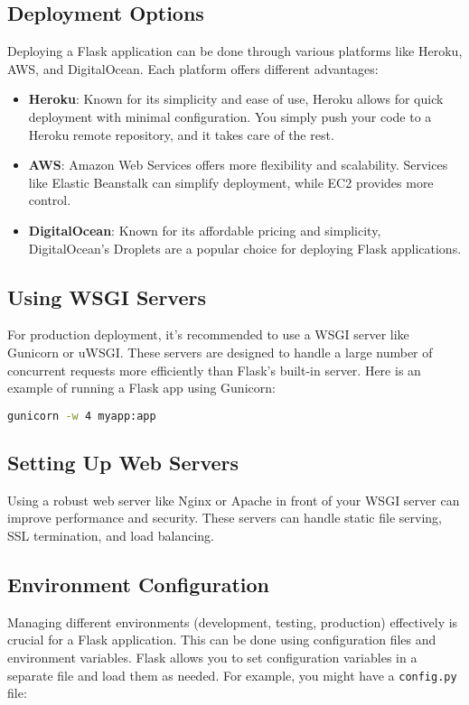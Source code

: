 \subsection{Deployment Options}
Deploying a Flask application can be done through various platforms like Heroku, AWS, and DigitalOcean. Each platform offers different advantages:
\begin{itemize}
	\item \textbf{Heroku}: Known for its simplicity and ease of use, Heroku allows for quick deployment with minimal configuration. You simply push your code to a Heroku remote repository, and it takes care of the rest.
	\item \textbf{AWS}: Amazon Web Services offers more flexibility and scalability. Services like Elastic Beanstalk can simplify deployment, while EC2 provides more control.
	\item \textbf{DigitalOcean}: Known for its affordable pricing and simplicity, DigitalOcean’s Droplets are a popular choice for deploying Flask applications.\cite{Flaskdocs:2024}
\end{itemize}

\subsection{Using WSGI Servers}
For production deployment, it's recommended to use a WSGI server like Gunicorn or uWSGI. These servers are designed to handle a large number of concurrent requests more efficiently than Flask's built-in server. Here is an example of running a Flask app using Gunicorn:

\begin{lstlisting}[language=bash]
	gunicorn -w 4 myapp:app
\end{lstlisting}

\subsection{Setting Up Web Servers}
Using a robust web server like Nginx or Apache in front of your WSGI server can improve performance and security. These servers can handle static file serving, SSL termination, and load balancing.

\subsection{Environment Configuration}
Managing different environments (development, testing, production) effectively is crucial for a Flask application. This can be done using configuration files and environment variables. Flask allows you to set configuration variables in a separate file and load them as needed. For example, you might have a \texttt{config.py} file:

